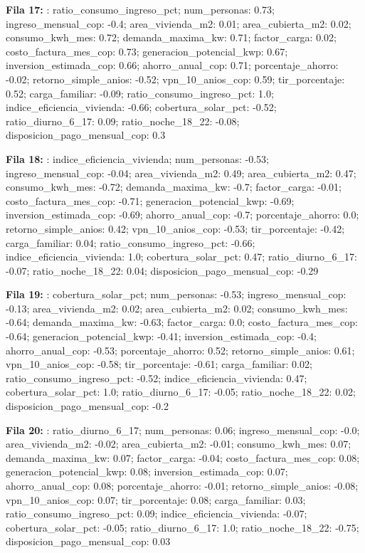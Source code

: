 {\footnotesize\textbf{Fila 17:} : ratio\_consumo\_ingreso\_pct; num\_personas: 0.73; ingreso\_mensual\_cop: -0.4; area\_vivienda\_m2: 0.01; area\_cubierta\_m2: 0.02; consumo\_kwh\_mes: 0.72; demanda\_maxima\_kw: 0.71; factor\_carga: 0.02; costo\_factura\_mes\_cop: 0.73; generacion\_potencial\_kwp: 0.67; inversion\_estimada\_cop: 0.66; ahorro\_anual\_cop: 0.71; porcentaje\_ahorro: -0.02; retorno\_simple\_anios: -0.52; vpn\_10\_anios\_cop: 0.59; tir\_porcentaje: 0.52; carga\_familiar: -0.09; ratio\_consumo\_ingreso\_pct: 1.0; indice\_eficiencia\_vivienda: -0.66; cobertura\_solar\_pct: -0.52; ratio\_diurno\_6\_17: 0.09; ratio\_noche\_18\_22: -0.08; disposicion\_pago\_mensual\_cop: 0.3\par}
{\footnotesize\textbf{Fila 18:} : indice\_eficiencia\_vivienda; num\_personas: -0.53; ingreso\_mensual\_cop: -0.04; area\_vivienda\_m2: 0.49; area\_cubierta\_m2: 0.47; consumo\_kwh\_mes: -0.72; demanda\_maxima\_kw: -0.7; factor\_carga: -0.01; costo\_factura\_mes\_cop: -0.71; generacion\_potencial\_kwp: -0.69; inversion\_estimada\_cop: -0.69; ahorro\_anual\_cop: -0.7; porcentaje\_ahorro: 0.0; retorno\_simple\_anios: 0.42; vpn\_10\_anios\_cop: -0.53; tir\_porcentaje: -0.42; carga\_familiar: 0.04; ratio\_consumo\_ingreso\_pct: -0.66; indice\_eficiencia\_vivienda: 1.0; cobertura\_solar\_pct: 0.47; ratio\_diurno\_6\_17: -0.07; ratio\_noche\_18\_22: 0.04; disposicion\_pago\_mensual\_cop: -0.29\par}
{\footnotesize\textbf{Fila 19:} : cobertura\_solar\_pct; num\_personas: -0.53; ingreso\_mensual\_cop: -0.13; area\_vivienda\_m2: 0.02; area\_cubierta\_m2: 0.02; consumo\_kwh\_mes: -0.64; demanda\_maxima\_kw: -0.63; factor\_carga: 0.0; costo\_factura\_mes\_cop: -0.64; generacion\_potencial\_kwp: -0.41; inversion\_estimada\_cop: -0.4; ahorro\_anual\_cop: -0.53; porcentaje\_ahorro: 0.52; retorno\_simple\_anios: 0.61; vpn\_10\_anios\_cop: -0.58; tir\_porcentaje: -0.61; carga\_familiar: 0.02; ratio\_consumo\_ingreso\_pct: -0.52; indice\_eficiencia\_vivienda: 0.47; cobertura\_solar\_pct: 1.0; ratio\_diurno\_6\_17: -0.05; ratio\_noche\_18\_22: 0.02; disposicion\_pago\_mensual\_cop: -0.2\par}
{\footnotesize\textbf{Fila 20:} : ratio\_diurno\_6\_17; num\_personas: 0.06; ingreso\_mensual\_cop: -0.0; area\_vivienda\_m2: -0.02; area\_cubierta\_m2: -0.01; consumo\_kwh\_mes: 0.07; demanda\_maxima\_kw: 0.07; factor\_carga: -0.04; costo\_factura\_mes\_cop: 0.08; generacion\_potencial\_kwp: 0.08; inversion\_estimada\_cop: 0.07; ahorro\_anual\_cop: 0.08; porcentaje\_ahorro: -0.01; retorno\_simple\_anios: -0.08; vpn\_10\_anios\_cop: 0.07; tir\_porcentaje: 0.08; carga\_familiar: 0.03; ratio\_consumo\_ingreso\_pct: 0.09; indice\_eficiencia\_vivienda: -0.07; cobertura\_solar\_pct: -0.05; ratio\_diurno\_6\_17: 1.0; ratio\_noche\_18\_22: -0.75; disposicion\_pago\_mensual\_cop: 0.03\par}

